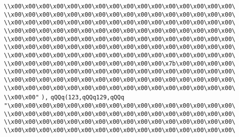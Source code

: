 \verb|\\x00\x00\x00\x00\x00\x00\x00\x00\x00\x00\x00\x00\x00\x00\x00\x00\|\newline
\verb|\\x00\x00\x00\x00\x00\x00\x00\x00\x00\x00\x00\x00\x00\x00\x00\x00\|\newline
\verb|\\x00\x00\x00\x00\x00\x00\x00\x00\x00\x00\x00\x00\x00\x00\x00\x00\|\newline
\verb|\\x00\x00\x00\x00\x00\x00\x00\x00\x00\x00\x00\x00\x00\x00\x00\x00\|\newline
\verb|\\x00\x00\x00\x00\x00\x00\x00\x00\x00\x00\x00\x00\x00\x00\x00\x00\|\newline
\verb|\\x00\x00\x00\x00\x00\x00\x00\x00\x00\x00\x00\x00\x00\x00\x00\x00\|\newline
\verb|\\x00\x00\x00\x00\x00\x00\x00\x00\x00\x00\x00\x00\x00\x00\x00\x00\|\newline
\verb|\\x00\x00\x00\x00\x00\x00\x00\x00\x00\x00\x00\x7b\x00\x00\x00\x00\|\newline
\verb|\\x00\x00\x00\x00\x00\x00\x00\x00\x00\x00\x00\x00\x00\x00\x00\x00\|\newline
\verb|\\x00\x00\x00\x00\x00\x00\x00\x00\x00\x00\x00\x00\x00\x00\x00\x00\|\newline
\verb|\\x00\x00\x00\x00\x00\x00\x00\x00\x00\x00\x00\x00\x00\x00\x00\x00\|\newline
\verb|\\x00\x00"|\newline
\verb|),|\newline
\verb|qQQq(123,qQQq129,qQQq|\newline
\verb|"\x00\x00\x00\x00\x00\x00\x00\x00\x00\x00\x00\x00\x00\x00\x00\x00\|\newline
\verb|\\x00\x00\x00\x00\x00\x00\x00\x00\x00\x00\x00\x00\x00\x00\x00\x00\|\newline
\verb|\\x00\x00\x00\x00\x00\x00\x00\x00\x00\x00\x00\x00\x00\x00\x00\x00\|\newline
\verb|\\x00\x00\x00\x00\x00\x00\x00\x00\x00\x00\x00\x00\x00\x00\x00\x00\|\newline
